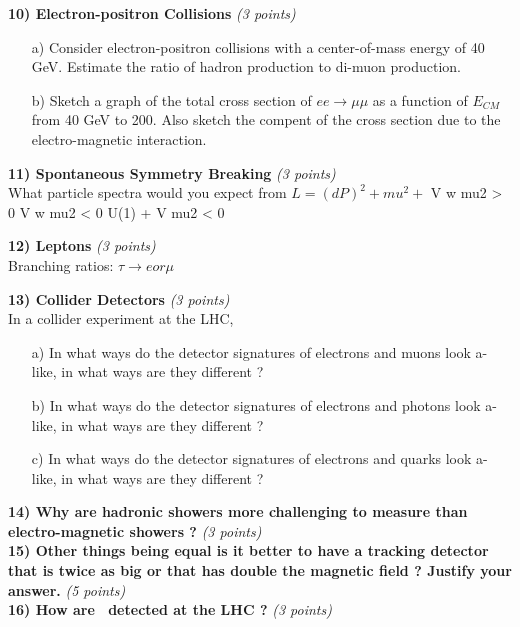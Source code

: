 {\textbf{10) Electron-positron Collisions } \hfill \textit{(3 points)}\\
\begin{itemize}
\item[a)]{Consider electron-positron collisions with a center-of-mass  energy of 40 GeV.
Estimate the ratio of hadron production to di-muon production. }
\item[b)]{Sketch a graph of the total cross section of $ee\rightarrow\mu\mu$ as a function of $E_{CM}$ from 40 GeV to 200. 
Also sketch the compent of the cross section due to the electro-magnetic interaction.}
\end{itemize}


\textbf{11) Spontaneous Symmetry Breaking  } \hfill \textit{(3 points)}\\
What particle spectra would you expect from  $L = (dP)^2 + mu^2 + $
V w  mu2 > 0
V w  mu2 < 0 
U(1) + V   mu2 < 0

\textbf{12) Leptons  } \hfill \textit{(3 points)}\\
Branching ratios:
$\tau \rightarrow e or \mu $

\textbf{13) Collider Detectors  } \hfill \textit{(3 points)}\\
In a collider experiment at the LHC,
\begin{itemize}
\item[a)] In what ways do the detector signatures of electrons and muons look a-like, in what ways are they different ?
\item[b)] In what ways do the detector signatures of electrons and photons look a-like, in what ways are they different ?
\item[c)] In what ways do the detector signatures of electrons and quarks look a-like, in what ways are they different ?
\end{itemize}

\textbf{14) Why are hadronic showers more challenging to measure than electro-magnetic showers ?  } \hfill \textit{(3 points)}\\



\textbf{15) Other things being equal is it better to have a tracking detector that is twice as big or that has double the magnetic field ?  Justify your answer.} \hfill \textit{(5 points)}\\

\textbf{16) How are \nus\ detected at the LHC ?} \hfill \textit{(3 points)}\\

}
